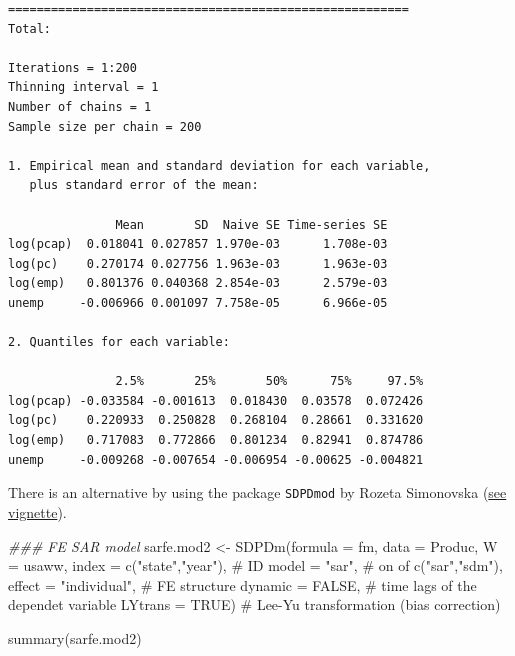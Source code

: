 \documentclass[
  letterpaper,
]{scrbook}
\newenvironment{Shaded}{\begin{snugshade}}{\end{snugshade}}
\newcommand{\AttributeTok}[1]{\textcolor[rgb]{0.40,0.45,0.13}{#1}}
\newcommand{\CommentTok}[1]{\textcolor[rgb]{0.37,0.37,0.37}{#1}}
\newcommand{\ConstantTok}[1]{\textcolor[rgb]{0.56,0.35,0.01}{#1}}
\newcommand{\DocumentationTok}[1]{\textcolor[rgb]{0.37,0.37,0.37}{\textit{#1}}}
\newcommand{\FunctionTok}[1]{\textcolor[rgb]{0.28,0.35,0.67}{#1}}
\newcommand{\NormalTok}[1]{\textcolor[rgb]{0.00,0.23,0.31}{#1}}
\newcommand{\OtherTok}[1]{\textcolor[rgb]{0.00,0.23,0.31}{#1}}
\newcommand{\StringTok}[1]{\textcolor[rgb]{0.13,0.47,0.30}{#1}}
\begin{document}
\begin{verbatim}
========================================================
Total:

Iterations = 1:200
Thinning interval = 1 
Number of chains = 1 
Sample size per chain = 200 

1. Empirical mean and standard deviation for each variable,
   plus standard error of the mean:

               Mean       SD  Naive SE Time-series SE
log(pcap)  0.018041 0.027857 1.970e-03      1.708e-03
log(pc)    0.270174 0.027756 1.963e-03      1.963e-03
log(emp)   0.801376 0.040368 2.854e-03      2.579e-03
unemp     -0.006966 0.001097 7.758e-05      6.966e-05

2. Quantiles for each variable:

               2.5%       25%       50%      75%     97.5%
log(pcap) -0.033584 -0.001613  0.018430  0.03578  0.072426
log(pc)    0.220933  0.250828  0.268104  0.28661  0.331620
log(emp)   0.717083  0.772866  0.801234  0.82941  0.874786
unemp     -0.009268 -0.007654 -0.006954 -0.00625 -0.004821
\end{verbatim}

There is an alternative by using the package \texttt{SDPDmod} by Rozeta
Simonovska
(\href{https://cran.r-project.org/web/packages/SDPDmod/vignettes/spatial_model.html}{see
vignette}).

\begin{Shaded}
\begin{Highlighting}[]
\DocumentationTok{\#\#\# FE SAR model}
\NormalTok{sarfe.mod2 }\OtherTok{\textless{}{-}} \FunctionTok{SDPDm}\NormalTok{(}\AttributeTok{formula =}\NormalTok{ fm, }
                    \AttributeTok{data =}\NormalTok{ Produc, }
                    \AttributeTok{W =}\NormalTok{ usaww,                 }
                    \AttributeTok{index =} \FunctionTok{c}\NormalTok{(}\StringTok{"state"}\NormalTok{,}\StringTok{"year"}\NormalTok{), }\CommentTok{\# ID}
                    \AttributeTok{model =} \StringTok{"sar"}\NormalTok{,             }\CommentTok{\# on of c("sar","sdm"),}
                    \AttributeTok{effect =} \StringTok{"individual"}\NormalTok{,     }\CommentTok{\# FE structure}
                    \AttributeTok{dynamic =} \ConstantTok{FALSE}\NormalTok{,           }\CommentTok{\# time lags of the dependet variable}
                    \AttributeTok{LYtrans =} \ConstantTok{TRUE}\NormalTok{)            }\CommentTok{\# Lee{-}Yu transformation (bias correction)}

\FunctionTok{summary}\NormalTok{(sarfe.mod2)}
\end{Highlighting}
\end{Shaded}
\end{document}
